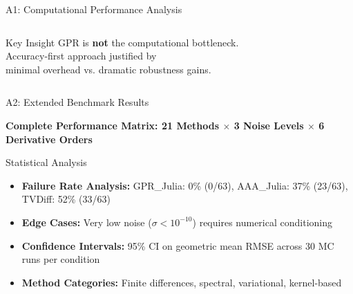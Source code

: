 \documentclass[aspectratio=169]{beamer}
\begin{document}
\begin{frame}{A1: Computational Performance Analysis}
\begin{columns}[t]
\begin{column}{0.48\textwidth}
      \vspace{0.5em}
      \begin{alertblock}{\small Key Insight}
        \footnotesize
        GPR is \textbf{not} the computational bottleneck.\\
        Accuracy-first approach justified by\\
        minimal overhead vs. dramatic robustness gains.
      \end{alertblock}
    \end{column}
  \end{columns}
  
\end{frame}

\begin{frame}{A2: Extended Benchmark Results}
  
  \begin{center}
    \small
    \textbf{Complete Performance Matrix: 21 Methods $\times$ 3 Noise Levels $\times$ 6 Derivative Orders}
  \end{center}
  
  \vspace{0.5em}
  \begin{center}
  \end{center}
  
  \vspace{0.5em}
  \begin{block}{\small Statistical Analysis}
    \tiny
    \begin{itemize}
      \item \textbf{Failure Rate Analysis:} GPR\_Julia: 0\% (0/63), AAA\_Julia: 37\% (23/63), TVDiff: 52\% (33/63)
      \item \textbf{Edge Cases:} Very low noise ($\sigma < 10^{-10}$) requires numerical conditioning
      \item \textbf{Confidence Intervals:} 95\% CI on geometric mean RMSE across 30 MC runs per condition
      \item \textbf{Method Categories:} Finite differences, spectral, variational, kernel-based
    \end{itemize}
  \end{block}
  
\end{frame}
\end{document}

